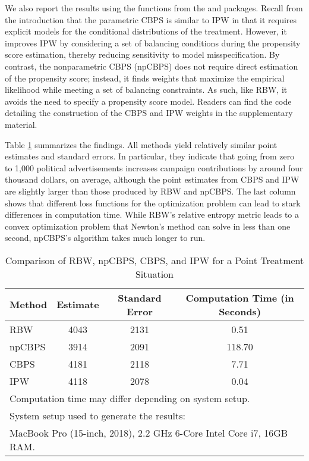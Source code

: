 We also report the results using the functions from the 
and  packages. Recall from the introduction that the
parametric CBPS is similar to IPW in that it requires explicit models
for the conditional distributions of the treatment. However, it improves
IPW by considering a set of balancing conditions during the propensity
score estimation, thereby reducing sensitivity to model
misspecification. By contrast, the nonparametric CBPS (npCBPS) does not
require direct estimation of the propensity score; instead, it finds
weights that maximize the empirical likelihood while meeting a set of
balancing constraints. As such, like RBW, it avoids the need to specify
a propensity score model. Readers can find the code detailing the
construction of the CBPS and IPW weights in the supplementary material.

Table \ref{tab:point-treatment-comparison} summarizes the findings. All
methods yield relatively similar point estimates and standard errors. In
particular, they indicate that going from zero to 1,000 political
advertisements increases campaign contributions by around four thousand
dollars, on average, although the point estimates from CBPS and IPW are
slightly larger than those produced by RBW and npCBPS. The last column
shows that different loss functions for the optimization problem can
lead to stark differences in computation time. While RBW's relative
entropy metric leads to a convex optimization problem that Newton's
method can solve in less than one second, npCBPS's algorithm takes much
longer to run.

\begin{Schunk}
\begin{table}[ht]

\caption{\label{tab:point-treatment-comparison}Comparison of RBW, npCBPS, CBPS, and IPW for a Point Treatment Situation}
\centering
\begin{tabular}[t]{lccc}
\toprule
Method & Estimate & Standard Error & Computation Time (in Seconds)\\
\midrule
RBW & 4043 & 2131 & 0.51\\
npCBPS & 3914 & 2091 & 118.70\\
CBPS & 4181 & 2118 & 7.71\\
IPW & 4118 & 2078 & 0.04\\
\bottomrule
\multicolumn{4}{l}{\textsuperscript{} Computation time may differ depending on system setup.}\\
\multicolumn{4}{l}{\textsuperscript{} System setup used to generate the results:}\\
\multicolumn{4}{l}{\textsuperscript{} MacBook Pro (15-inch, 2018), 2.2 GHz 6-Core Intel Core i7, 16GB RAM.}\\
\end{tabular}
\end{table}

\end{Schunk}

